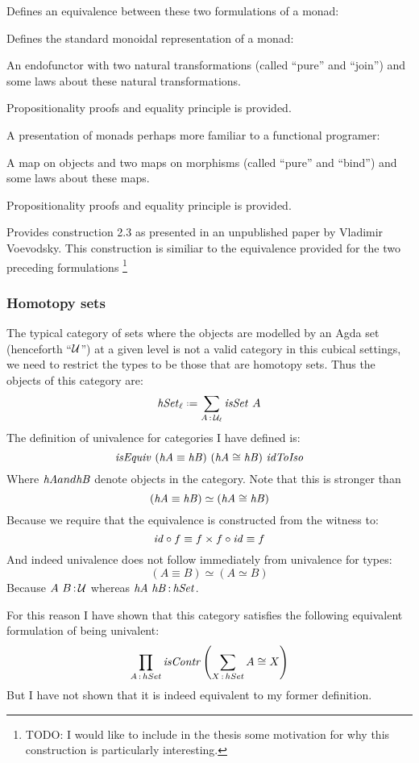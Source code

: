 Defines an equivalence between these two formulations of a monad:


Defines the standard monoidal representation of a monad:

An endofunctor with two natural transformations (called ``pure'' and ``join'')
and some laws about these natural transformations.

Propositionality proofs and equality principle is provided.


A presentation of monads perhaps more familiar to a functional programer:

A map on objects and two maps on morphisms (called ``pure'' and ``bind'') and
some laws about these maps.

Propositionality proofs and equality principle is provided.


Provides construction 2.3 as presented in an unpublished paper by Vladimir
Voevodsky. This construction is similiar to the equivalence provided for the two
preceding formulations
\footnote{ TODO: I would like to include in the thesis some motivation for why
  this construction is particularly interesting.}

\subsubsection{Homotopy sets}
The typical category of sets where the objects are modelled by an Agda set
(henceforth ``$\mathcal{U}$'') at a given level is not a valid category in this cubical
settings, we need to restrict the types to be those that are homotopy sets. Thus
the objects of this category are:
%
$$\hSet_\ell \defeq \sum_{A \tp \MCU_\ell} \isSet\ A$$
%
The definition of univalence for categories I have defined is:
%
$$\isEquiv\ (\hA \equiv \hB)\ (\hA \cong \hB)\ \idToIso$$
%
Where $\mathit{hA} and \mathit{hB}$ denote objects in the category. Note that this is stronger
than
%
$$(\mathit{hA} \equiv \mathit{hB}) \simeq (\mathit{hA} \cong \mathit{hB})$$
%
Because we require that the equivalence is constructed from the witness to:
%
$$\mathit{id} \circ f \equiv f \times f \circ \mathit{id} \equiv f$$
%
And indeed univalence does not follow immediately from univalence for types:
%
$$(A \equiv B) \simeq (A \simeq B)$$
%
Because $A\ B \,\mathord{:}\, \mathcal{U}$ whereas $\mathit{hA}\ \mathit{hB} \,\mathord{:}\, \mathit{hSet}$.

For this reason I have shown that this category satisfies the following
equivalent formulation of being univalent:
%
$$\prod_{A \,\mathord{:}\, hSet} \mathit{isContr} \left( \sum_{X \,\mathord{:}\, hSet} A \cong X \right)$$
%
But I have not shown that it is indeed equivalent to my former definition.
